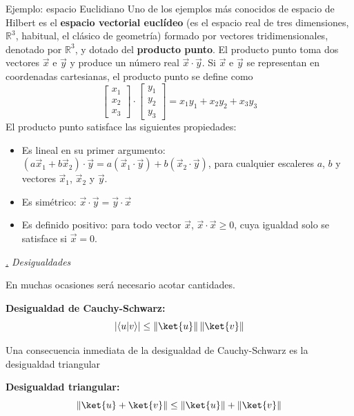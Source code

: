 \documentclass[a4paper,11pt]{book} %
\numberwithin{equation}{chapter}
\newcommand{\braket}[2]{\langle #1|#2\rangle}
\def\subsubiContadorIt{\par\addtocounter{subsubsection}{1}\underline{\it\thesubsubsection.}\hskip0.5cm \setcounter{subsubsubsectionIt}{0}}
\newcommand{\SubsubiIt}[1]{
		\subsubiContadorIt \textit{#1}
	}
\newcounter{subsubsubsectionIt}[subsubsection]
\begin{document}
	\begin{mybox_green}{Ejemplo: espacio Euclidiano}
	Uno de los ejemplos más conocidos de espacio de Hilbert es el \textbf{espacio vectorial euclídeo} (es el espacio real de tres dimensiones, $\mathbb{R}^3$, habitual, el clásico de geometría) formado por vectores tridimensionales, denotado por $\mathbb{R}^3$, y dotado del \textbf{producto punto}. El producto punto toma dos vectores $\vec{x}$ e $\vec{y}$ y produce un número real $\vec{x} \cdot \vec{y}$. Si $\vec{x}$ e $\vec{y}$ se representan en coordenadas cartesianas, el producto punto se define como
		\begin{equation*}
		\begin{bmatrix}
		x_1 \\ x_2 \\ x_3
		\end{bmatrix}
		\cdot
		\begin{bmatrix}
		y_1 \\ y_2 \\ y_3
		\end{bmatrix} 
		= x_1y_1 + x_2y_2 + x_3y_3
		\end{equation*}
	El producto punto satisface las siguientes propiedades:
	\begin{itemize}
		\item Es lineal en su primer argumento: $(a \vec{x}_1 + b \vec{x}_2) \cdot \vec{y} = a (\vec{x}_1 \cdot \vec{y}) + b (\vec{x}_2 \cdot \vec{y})$, para cualquier escaleres $a$, $b$ y vectores $\vec{x}_1$, $\vec{x}_2$ y $\vec{y}$.
		
		\item Es simétrico: $\vec{x} \cdot \vec{y} = \vec{y} \cdot \vec{x}$
		\item Es definido positivo: para todo vector $\vec{x}$, $\vec{x} \cdot \vec{x} \geq 0$, cuya igualdad solo se satisface si $\vec{x} = 0$.
	\end{itemize}
	\end{mybox_green}
		

			\SubsubiIt{Desigualdades}

En muchas ocasiones será necesario acotar cantidades. 
	\begin{mybox_gray2}{}
	\textbf{Desigualdad de Cauchy-Schwarz:}
		\begin{equation}
		|\braket{u}{v}| \leq \|\ket{u}\|\, \|\ket{v}\|
		\end{equation}
	\end{mybox_gray2}

Una consecuencia inmediata  de la desigualdad de Cauchy-Schwarz es la desigualdad triangular
	\begin{mybox_gray2}{}
	\textbf{Desigualdad triangular:}
		\begin{equation}
		\|\ket{u}+\ket{v}\| \leq \|\ket{u}\|+ \|\ket{v}\|
		\end{equation}
	\end{mybox_gray2}
\end{document}
